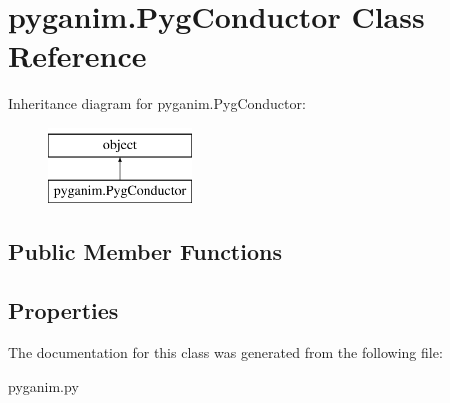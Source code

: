 \hypertarget{classpyganim_1_1_pyg_conductor}{}\section{pyganim.\+Pyg\+Conductor Class Reference}
\label{classpyganim_1_1_pyg_conductor}
Inheritance diagram for pyganim.\+Pyg\+Conductor\+:\begin{figure}[H]
\begin{center}
\leavevmode
\includegraphics[height=2.000000cm]{classpyganim_1_1_pyg_conductor}
\end{center}
\end{figure}
\subsection*{Public Member Functions}
\begin{DoxyCompactItemize}
\end{DoxyCompactItemize}
\subsection*{Properties}
\begin{DoxyCompactItemize}
\end{DoxyCompactItemize}


The documentation for this class was generated from the following file\+:\begin{DoxyCompactItemize}
\item 
pyganim.\+py\end{DoxyCompactItemize}
